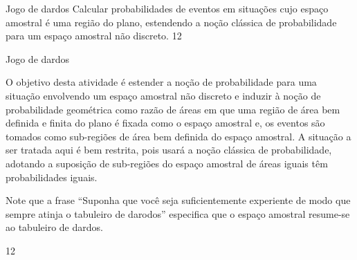 \begin{objectives}{Jogo de dardos}
{
Calcular probabilidades de eventos em situações cujo espaço amostral é uma região do plano, estendendo a noção clássica de probabilidade para um espaço amostral não discreto.
}{1}{2}
\end{objectives}
\begin{sugestions}{Jogo de dardos}
{
O objetivo desta atividade é estender a noção de probabilidade para uma situação envolvendo um espaço amostral não discreto e induzir à noção de probabilidade geométrica como razão de áreas em que uma região de área bem definida e finita do plano é fixada como o espaço amostral e, os eventos são tomados como sub-regiões de área bem definida do espaço amostral. A situação a ser tratada aqui é bem restrita, pois usará a noção clássica de probabilidade, adotando a suposição de sub-regiões do espaço amostral de áreas iguais têm probabilidades iguais.

Note que a frase “Suponha que você seja suficientemente experiente de modo que sempre atinja o tabuleiro de darodos”{} especifica que o espaço amostral resume-se ao tabuleiro de dardos.
}{1}{2}
\end{sugestions}
\clearmargin

